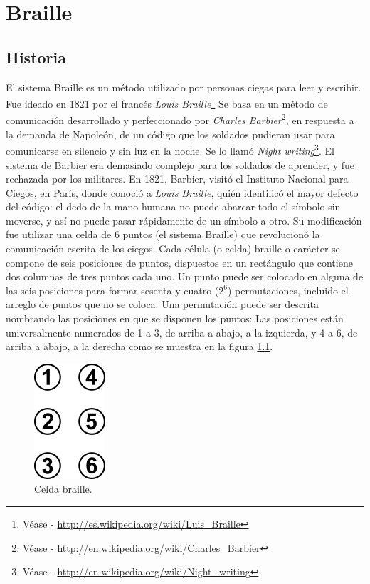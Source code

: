 \chapter{Braille}

\section{Historia}
El sistema Braille es un m\'etodo utilizado por personas ciegas para leer y 
escribir. Fue ideado en 1821 por el franc\'es \emph{Louis
Braille}\footnote{V\'ease - \url{http://es.wikipedia.org/wiki/Luis_Braille}}
Se basa en un m\'etodo de comunicaci\'on desarrollado y perfeccionado por 
\emph{Charles Barbier}\footnote{V\'ease -
\url{http://en.wikipedia.org/wiki/Charles_Barbier}}, en respuesta a la demanda
de Napole\'on, de un c\'odigo que los soldados pudieran usar para comunicarse
en silencio y sin luz en la noche.
Se lo llam\'o \emph{Night writing}\footnote{V\'ease -
\url{http://en.wikipedia.org/wiki/Night_writing}}. El sistema de Barbier era
demasiado complejo para los soldados de aprender, y fue rechazada por los
militares. 
En 1821, Barbier, visit\'o el Instituto Nacional para Ciegos, en Par\'is, donde
conoci\'o a \emph{Louis Braille}, qui\'en identific\'o el mayor defecto del
c\'odigo: el dedo de la mano humana no puede abarcar todo el s\'imbolo sin
moverse, y as\'i no puede pasar r\'apidamente de un s\'imbolo a otro.
Su modificaci\'on fue utilizar una celda de 6 puntos (el sistema Braille) que 
revolucion\'o la comunicaci\'on escrita de los ciegos.
Cada c\'elula (o celda) braille o car\'acter se compone de seis posiciones de 
puntos, dispuestos en un rect\'angulo que contiene dos columnas de tres puntos
cada uno. Un punto puede ser colocado en alguna de las seis posiciones para
formar sesenta y cuatro ($2^{6}$) permutaciones, incluido el arreglo de puntos
que no se coloca. Una permutaci\'on puede ser descrita nombrando las posiciones
en que se disponen los puntos: Las posiciones est\'an universalmente numerados
de 1 a 3, de arriba a abajo, a la izquierda, y 4 a 6, de arriba a abajo, a la
derecha como se muestra en la figura \ref{fig:braille_cell}.

\clearpage
\begin{figure}[htp]
\centering
\includegraphics[scale=0.6]{./img/braille_cell.png}
\caption{Celda braille.}
\label{fig:braille_cell}
\end{figure}
\label{cap:braille_cell}

